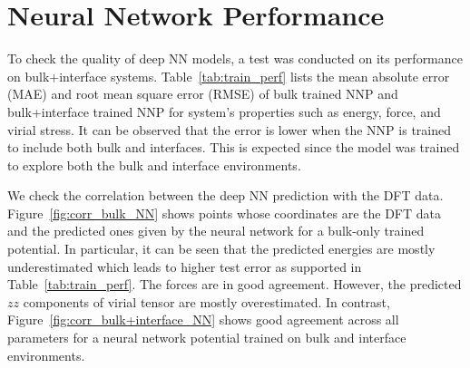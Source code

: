\section{Neural Network Performance}
To check the quality of deep NN models, a test was conducted on its performance
on bulk+interface systems. Table~\ref*{tab:train_perf} lists the mean absolute
error (MAE) and root mean square error (RMSE) of bulk trained NNP and
bulk+interface trained NNP for system's properties such as energy, force, and
virial stress. It can be observed that the error is lower when the NNP is
trained to include both bulk  and interfaces. This is expected since the model
was trained to explore both the bulk and interface environments.
\begin{table}[tbhp!]
  \centering
  \caption{Performance of bulk trained NNP and
    bulk+interface trained NNP on bulk+interface validation dataset.}
  \label{tab:train_perf}
\end{table}

We check the correlation between the deep NN prediction with the DFT data.
Figure~\ref{fig:corr_bulk_NN} shows points whose coordinates are the DFT data
and the predicted ones given
by the neural network for a bulk-only trained potential. In particular, it can
be seen that the predicted energies are mostly underestimated which leads to
higher test error as supported in Table~\ref{tab:train_perf}. The forces are in
good agreement. However, the predicted $zz$ components of virial tensor are
mostly overestimated. In contrast, Figure~\ref{fig:corr_bulk+interface_NN}
shows good agreement across all parameters for a neural network potential
trained on bulk and interface environments.

